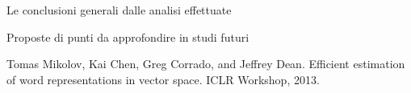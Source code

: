 \documentclass[
12pt, %
a4paper, %
oneside, %
headinclude,footinclude, %
BCOR5mm, %
]{scrartcl}
\begin{document}
	Le conclusioni generali dalle analisi effettuate

	Proposte di punti da approfondire in studi futuri





\begin{thebibliography}{12}

    Tomas Mikolov, Kai Chen, Greg Corrado, and Jeffrey Dean. Efficient estimation of word representations
    in vector space. ICLR Workshop, 2013.


\end{thebibliography}

\end{document}

